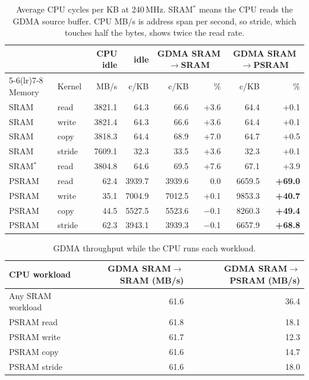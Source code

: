 \documentclass[11pt,a4paper]{article}
\begin{document}
\begin{table}[h]
\centering
\small
\begin{tabular}{@{}llr r rr rr@{}}
\toprule
 & & CPU idle & idle & \multicolumn{2}{c}{GDMA SRAM$\to$SRAM} & \multicolumn{2}{c}{GDMA SRAM$\to$PSRAM} \\
\cmidrule(lr){5-6}\cmidrule(lr){7-8}
Memory & Kernel & MB/s & c/KB & c/KB & \% & c/KB & \% \\
\midrule
SRAM & read & 3821.1 & 64.3 & 66.6 & +3.6 & 64.4 & +0.1 \\
SRAM & write & 3821.4 & 64.3 & 66.6 & +3.6 & 64.4 & +0.1 \\
SRAM & copy & 3818.3 & 64.4 & 68.9 & +7.0 & 64.7 & +0.5 \\
SRAM & stride & 7609.1 & 32.3 & 33.5 & +3.6 & 32.3 & +0.1 \\
SRAM$^*$ & read & 3804.8 & 64.6 & 69.5 & +7.6 & 67.1 & +3.9 \\
\midrule
PSRAM & read & 62.4 & 3939.7 & 3939.6 & 0.0 & 6659.5 & \textbf{+69.0} \\
PSRAM & write & 35.1 & 7004.9 & 7012.5 & +0.1 & 9853.3 & \textbf{+40.7} \\
PSRAM & copy & 44.5 & 5527.5 & 5523.6 & $-$0.1 & 8260.3 & \textbf{+49.4} \\
PSRAM & stride & 62.3 & 3943.1 & 3939.3 & $-$0.1 & 6657.9 & \textbf{+68.8} \\
\bottomrule
\end{tabular}
\caption{Average CPU cycles per KB at 240\,MHz. SRAM$^*$ means the CPU reads the GDMA source buffer.
CPU MB/s is address span per second, so stride, which touches half the bytes, shows twice the read rate.}
\label{tab:matrix}
\end{table}

\begin{table}[h]
\centering
\begin{tabular}{@{}lrr@{}}
\toprule
CPU workload & GDMA SRAM$\to$SRAM (MB/s) & GDMA SRAM$\to$PSRAM (MB/s) \\
\midrule
Any SRAM workload & 61.6 & 36.4 \\
PSRAM read   & 61.8 & 18.1 \\
PSRAM write  & 61.7 & 12.3 \\
PSRAM copy   & 61.6 & 14.7 \\
PSRAM stride & 61.6 & 18.0 \\
\bottomrule
\end{tabular}
\caption{GDMA throughput while the CPU runs each workload.}
\label{tab:gdma}
\end{table}
\end{document}
